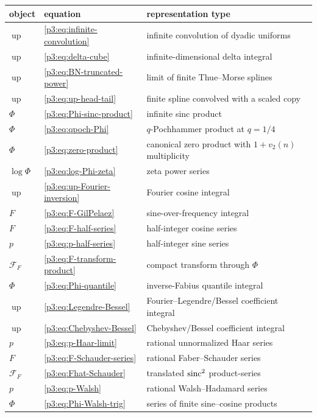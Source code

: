 \documentclass[11pt]{article}
\theoremstyle{definition}
\theoremstyle{remark}
\newcommand{\Up}{\operatorname{up}}
\begin{document}
\begin{longtable}{@{}p{}p{}p{}@{}}
\toprule
object & equation & representation type\\
\midrule
\endhead
$\Up$ & \eqref{p3:eq:infinite-convolution} & infinite convolution of dyadic uniforms\\
$\Up$ & \eqref{p3:eq:delta-cube} & infinite-dimensional delta integral\\
$\Up$ & \eqref{p3:eq:BN-truncated-power} & limit of finite Thue--Morse splines\\
$\Up$ & \eqref{p3:eq:up-head-tail} & finite spline convolved with a scaled copy\\
$\Phi$ & \eqref{p3:eq:Phi-sinc-product} & infinite sinc product\\
$\Phi$ & \eqref{p3:eq:qpoch-Phi} & $q$-Pochhammer product at $q=1/4$\\
$\Phi$ & \eqref{p3:eq:zero-product} & canonical zero product with $1+v_2(n)$ multiplicity\\
$\log\Phi$ & \eqref{p3:eq:log-Phi-zeta} & zeta power series\\
$\Up$ & \eqref{p3:eq:up-Fourier-inversion} & Fourier cosine integral\\
$F$ & \eqref{p3:eq:F-GilPelaez} & sine-over-frequency integral\\
$F$ & \eqref{p3:eq:F-half-series} & half-integer cosine series\\
$p$ & \eqref{p3:eq:p-half-series} & half-integer sine series\\
$\mathscr F_F$ & \eqref{p3:eq:F-transform-product} & compact transform through $\Phi$\\
$\Phi$ & \eqref{p3:eq:Phi-quantile} & inverse-Fabius quantile integral\\
$\Up$ & \eqref{p3:eq:Legendre-Bessel} & Fourier--Legendre/Bessel coefficient integral\\
$\Up$ & \eqref{p3:eq:Chebyshev-Bessel} & Chebyshev/Bessel coefficient integral\\
$p$ & \eqref{p3:eq:p-Haar-limit} & rational unnormalized Haar series\\
$F$ & \eqref{p3:eq:F-Schauder-series} & rational Faber--Schauder series\\
$\mathscr F_F$ & \eqref{p3:eq:Fhat-Schauder} & translated $\operatorname{sinc}^2$ product-series\\
$p$ & \eqref{p3:eq:p-Walsh} & rational Walsh--Hadamard series\\
$\Phi$ & \eqref{p3:eq:Phi-Walsh-trig} & series of finite sine--cosine products\\

\end{longtable}
\end{document}
